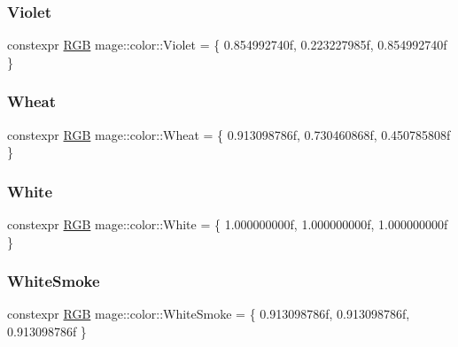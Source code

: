 \hypertarget{namespacemage_1_1color_a2e9d37cb1ef054fad5b999c98e4bb80c}{}\label{namespacemage_1_1color_a2e9d37cb1ef054fad5b999c98e4bb80c} 
\subsubsection{\texorpdfstring{Violet}{Violet}}
{\footnotesize\ttfamily constexpr \hyperlink{structmage_1_1_r_g_b}{R\+GB} mage\+::color\+::\+Violet = \{ 0.\+854992740f, 0.\+223227985f, 0.\+854992740f \}}

\hypertarget{namespacemage_1_1color_a7e58d877ef2ef3fdfe2520b1e8090cdf}{}\label{namespacemage_1_1color_a7e58d877ef2ef3fdfe2520b1e8090cdf} 
\subsubsection{\texorpdfstring{Wheat}{Wheat}}
{\footnotesize\ttfamily constexpr \hyperlink{structmage_1_1_r_g_b}{R\+GB} mage\+::color\+::\+Wheat = \{ 0.\+913098786f, 0.\+730460868f, 0.\+450785808f \}}

\hypertarget{namespacemage_1_1color_a39aae61faf172a41b44e2d308e1e4da6}{}\label{namespacemage_1_1color_a39aae61faf172a41b44e2d308e1e4da6} 
\subsubsection{\texorpdfstring{White}{White}}
{\footnotesize\ttfamily constexpr \hyperlink{structmage_1_1_r_g_b}{R\+GB} mage\+::color\+::\+White = \{ 1.\+000000000f, 1.\+000000000f, 1.\+000000000f \}}

\hypertarget{namespacemage_1_1color_ad44d164eafa183126c9287e9a0d1d97d}{}\label{namespacemage_1_1color_ad44d164eafa183126c9287e9a0d1d97d} 
\subsubsection{\texorpdfstring{White\+Smoke}{WhiteSmoke}}
{\footnotesize\ttfamily constexpr \hyperlink{structmage_1_1_r_g_b}{R\+GB} mage\+::color\+::\+White\+Smoke = \{ 0.\+913098786f, 0.\+913098786f, 0.\+913098786f \}}

